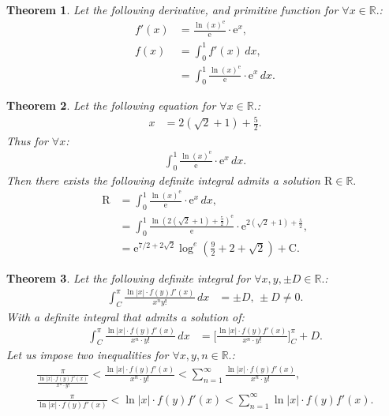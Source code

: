 \documentclass[10pt]{article}
\theoremstyle{plain}
\newtheorem{theorem}{Theorem}[section]
\theoremstyle{definition}
\theoremstyle{remark}
\begin{document}
\begin{theorem}
	Let the following derivative, and primitive function for $\forall x \in \mathbb{R}.$:
	\begin{align*}
		f'(x)&= \frac{\ln (x)^{\mathrm{e}}}{\mathrm{e}} \cdot \mathrm{e}^{x},\\
		f(x) &= \int_{0}^{1} f'(x)\, dx,\\
		&= \int_{0}^{1} \frac{\ln (x)^{\mathrm{e}}}{\mathrm{e}} \cdot \mathrm{e}^{x} \, dx.
	\end{align*}
\end{theorem}

\begin{theorem}
	Let the following equation for $\forall x \in \mathbb{R}.$:
	\begin{align*}
		x &= 2(\sqrt{2} + 1) + \frac{5}{2}.
	\end{align*}
	Thus for $\forall x$:
	\begin{align*}
		\int_{0}^{1} \frac{\ln (x)^{\mathrm{e}}}{\mathrm{e}} \cdot \mathrm{e}^{x} \, dx.
	\end{align*}
	Then there exists the following definite integral admits a solution $\mathrm{R} \in \mathbb{R}.$
	\begin{align*}
		\mathrm{R} &= \int_{0}^{1} \frac{\ln (x)^{\mathrm{e}}}{\mathrm{e}} \cdot \mathrm{e}^{x} \, dx,\\
		&= \int_{0}^{1} \frac{\ln (2(\sqrt{2} + 1) + \frac{5}{2})^{\mathrm{e}}}{\mathrm{e}} \cdot \mathrm{e}^{2(\sqrt{2} + 1) + \frac{5}{2}},\\
		&= \mathrm{e}^{7/2+2 \sqrt{2}} \log^{e}(\frac{9}{2}+2+\sqrt{2}) + \mathrm{C}.
	\end{align*}
\end{theorem}

\begin{theorem}
	\label{theo:2.31}
	Let the following definite integral for $\forall x, y, \pm D \in \mathbb{R}.$:
	\begin{align*}
		\int_{C}^{\pi} \frac{ \ln |x| \cdot f(y)f'(x) }{x^{n}y!} \, dx &= \pm D, \, \pm D \neq 0.
	\end{align*}
	With a definite integral that admits a solution of:
	\begin{align*}
		\int_{C}^{\pi} \frac{ \ln |x| \cdot f(y)f'(x) }{x^{n} \cdot y!} \, dx &= \big[\frac{ \ln |x| \cdot f(y)f'(x) }{x^{n} \cdot y!}\big]_{C}^{\pi} + D.
	\end{align*}
	Let us impose two inequalities for $\forall x, y, n \in \mathbb{R}.$:
	\begin{align*}
		\frac{\pi}{\frac{ \ln |x| \cdot f(y)f'(x) }{x^{n} \cdot  y!}} < \frac{ \ln |x| \cdot f(y)f'(x) }{x^{n} \cdot y!} < \sum_{n=1}^{\infty} \frac{ \ln |x| \cdot f(y)f'(x) }{x^{n} \cdot y!},\\
	\frac{\pi}{\ln |x| \cdot f(y)f'(x) } < \ln |x| \cdot f(y)f'(x)  < \sum_{n=1}^{\infty} \ln |x| \cdot f(y)f'(x).
	\end{align*}
\end{theorem}
\end{document}

